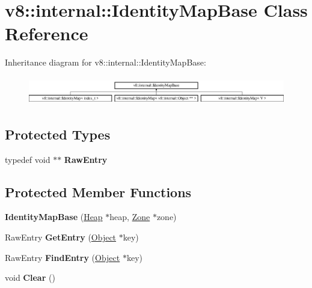 \hypertarget{classv8_1_1internal_1_1_identity_map_base}{}\section{v8\+:\+:internal\+:\+:Identity\+Map\+Base Class Reference}
\label{classv8_1_1internal_1_1_identity_map_base}
Inheritance diagram for v8\+:\+:internal\+:\+:Identity\+Map\+Base\+:\begin{figure}[H]
\begin{center}
\leavevmode
\includegraphics[height=1.240310cm]{classv8_1_1internal_1_1_identity_map_base}
\end{center}
\end{figure}
\subsection*{Protected Types}
\begin{DoxyCompactItemize}
\item 
typedef void $\ast$$\ast$ {\bfseries Raw\+Entry}\hypertarget{classv8_1_1internal_1_1_identity_map_base_a9b11c93a50924ab8628431ad57eeddbe}{}\label{classv8_1_1internal_1_1_identity_map_base_a9b11c93a50924ab8628431ad57eeddbe}

\end{DoxyCompactItemize}
\subsection*{Protected Member Functions}
\begin{DoxyCompactItemize}
\item 
{\bfseries Identity\+Map\+Base} (\hyperlink{classv8_1_1internal_1_1_heap}{Heap} $\ast$heap, \hyperlink{classv8_1_1internal_1_1_zone}{Zone} $\ast$zone)\hypertarget{classv8_1_1internal_1_1_identity_map_base_ae7cd4944099908129095126e35d958a9}{}\label{classv8_1_1internal_1_1_identity_map_base_ae7cd4944099908129095126e35d958a9}

\item 
Raw\+Entry {\bfseries Get\+Entry} (\hyperlink{classv8_1_1internal_1_1_object}{Object} $\ast$key)\hypertarget{classv8_1_1internal_1_1_identity_map_base_ae60ac370a12432aed38515c97e1310c5}{}\label{classv8_1_1internal_1_1_identity_map_base_ae60ac370a12432aed38515c97e1310c5}

\item 
Raw\+Entry {\bfseries Find\+Entry} (\hyperlink{classv8_1_1internal_1_1_object}{Object} $\ast$key)\hypertarget{classv8_1_1internal_1_1_identity_map_base_ab0979b54a742f9d2ad474d2f8b878581}{}\label{classv8_1_1internal_1_1_identity_map_base_ab0979b54a742f9d2ad474d2f8b878581}

\item 
void {\bfseries Clear} ()\hypertarget{classv8_1_1internal_1_1_identity_map_base_abf639aef94ebb3c75d4dec921e0e81eb}{}\label{classv8_1_1internal_1_1_identity_map_base_abf639aef94ebb3c75d4dec921e0e81eb}

\end{DoxyCompactItemize}

